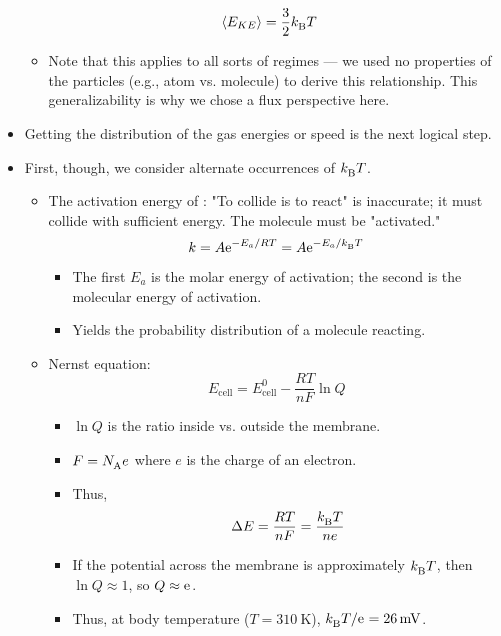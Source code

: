\documentclass[../notes.tex]{subfiles}
\begin{document}
\begin{itemize}
\begin{itemize}
\begin{align*}
            \prb{E_{KE}} &= \frac{3}{2}\kB T
        \end{align*}
        \item Note that this applies to all sorts of regimes --- we used no properties of the particles (e.g., atom vs. molecule) to derive this relationship. This generalizability is why we chose a flux perspective here.
    \end{itemize}
    \item Getting the distribution of the gas energies or speed is the next logical step.
    \item First, though, we consider alternate occurrences of $\kB T$.
    \begin{itemize}
        \item The activation energy of \textcite{bib:ArrheniusEqn}: "To collide is to react" is inaccurate; it must collide with sufficient energy. The molecule must be "activated."
        \begin{equation*}
            k = A\e[-E_a/RT] = A\e[-E_a/\kB T]
        \end{equation*}
        \begin{itemize}
            \item The first $E_a$ is the molar energy of activation; the second is the molecular energy of activation.
            \item Yields the probability distribution of a molecule reacting.
        \end{itemize}
        \item Nernst equation:
        \begin{equation*}
            E_\text{cell} = E_\text{cell}^0-\frac{RT}{nF}\ln Q
        \end{equation*}
        \begin{itemize}
            \item $\ln Q$ is the ratio inside vs. outside the membrane.
            \item $F=\NA e$ where $e$ is the charge of an electron.
            \item Thus,
            \begin{equation*}
                \Delta E = \frac{RT}{nF} = \frac{\kB T}{ne}
            \end{equation*}
            \item If the potential across the membrane is approximately $\kB T$, then $\ln Q\approx 1$, so $Q\approx\e$.
            \item Thus, at body temperature ($T=\SI{310}{\kelvin}$), $\kB T/\e=\SI{26}{\milli\volt}$.

\end{itemize}
\end{itemize}
\end{itemize}
\end{document}
